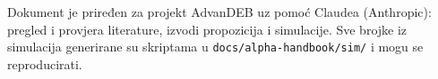 \begin{titlepage}
\vfill
{\small\color{siva} Dokument je priređen za projekt AdvanDEB uz pomoć Claudea (Anthropic): pregled i provjera literature, izvodi propozicija i simulacije. Sve brojke iz simulacija generirane su skriptama u \texttt{docs/alpha-handbook/sim/} i mogu se reproducirati.\par}
\end{titlepage}

{\small\setlength{\parskip}{0pt}\tableofcontents}
\clearpage
